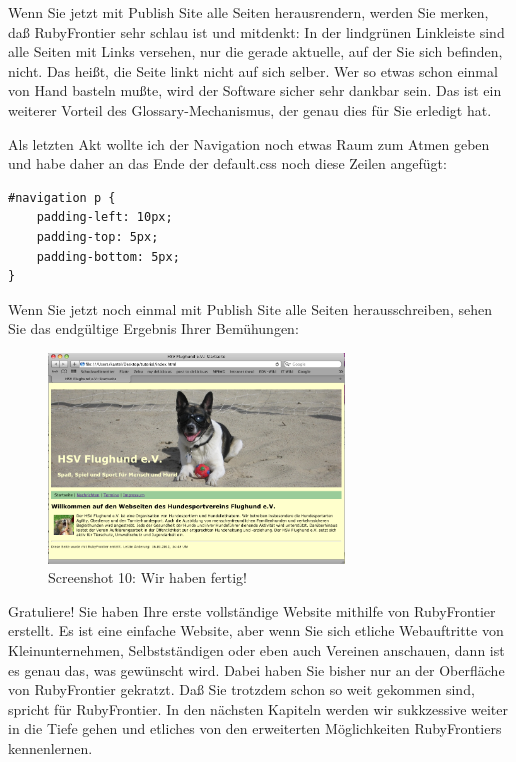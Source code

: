 \documentclass[11pt]{report}
\begin{document}
Wenn Sie jetzt mit Publish Site alle Seiten herausrendern, werden Sie
merken, daß RubyFrontier sehr schlau ist und mitdenkt: In der
lindgrünen Linkleiste sind alle Seiten mit Links versehen, nur die
gerade aktuelle, auf der Sie sich befinden, nicht. Das heißt, die
Seite linkt nicht auf sich selber. Wer so etwas schon einmal von Hand
basteln mußte, wird der Software sicher sehr dankbar sein. Das ist ein
weiterer Vorteil des Glossary-Mechanismus, der genau dies für Sie
erledigt hat.

Als letzten Akt wollte ich der Navigation noch etwas Raum zum Atmen
geben und habe daher an das Ende der default.css noch diese Zeilen
angefügt:


\begin{verbatim}
#navigation p {
    padding-left: 10px;
    padding-top: 5px;
    padding-bottom: 5px;
}
\end{verbatim}

Wenn Sie jetzt noch einmal mit Publish Site alle Seiten
herausschreiben, sehen Sie das endgültige Ergebnis Ihrer Bemühungen:


\begin{figure}[h!]
\centering
\includegraphics[width=0.7\textwidth]{./images/flughund10.png}
\caption{\label{flughund10}Screenshot 10: Wir haben fertig!}
\end{figure}


Gratuliere! Sie haben Ihre erste vollständige Website mithilfe von
RubyFrontier erstellt. Es ist eine einfache Website, aber wenn Sie
sich etliche Webauftritte von Kleinunternehmen, Selbstständigen oder
eben auch Vereinen anschauen, dann ist es genau das, was gewünscht
wird. Dabei haben Sie bisher nur an der Oberfläche von RubyFrontier
gekratzt. Daß Sie trotzdem schon so weit gekommen sind, spricht für
RubyFrontier. In den nächsten Kapiteln werden wir sukkzessive weiter
in die Tiefe gehen und etliches von den erweiterten Möglichkeiten
RubyFrontiers kennenlernen.
\end{document}
